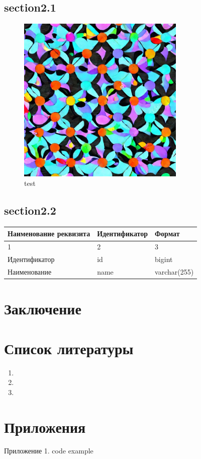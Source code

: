 \documentclass[14pt,A4]{extarticle}
\begin{document}
\subsection{section2.1}

\begin{figure}[H]
 \centering
 \includegraphics[height=8cm]{img/test2}
 \caption{test}
 \label{fig:image}
\end{figure}



\subsection{section2.2}

\noindent\begin{tabular}{|l|l|l|}
  \hline
  Наименование реквизита&Идентификатор&Формат \\
  \hline
  1&2&3 \\
  \hline
  Идентификатор&id&bigint \\
  \hline
  Наименование&name&varchar(255) \\
  \hline
 \end{tabular}



\newpage

\section*{Заключение}

\newpage

\section*{Список литературы}

\begin{enumerate}
 \item 
 \item 
 \item 
\end{enumerate}



\newpage

\section*{Приложения}

Приложение 1. code example



\end{document}
